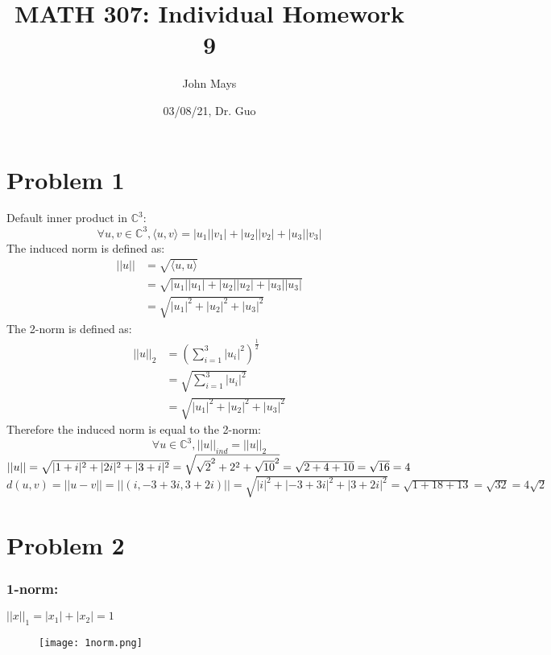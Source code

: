\documentclass{article}
\title{\textbf{MATH 307: Individual Homework 9}}
\author{John Mays}
\date{03/08/21, Dr. Guo}
\begin{document}
\maketitle

\section*{Problem 1}
Default inner product in $\mathbb{C}^3$:
\begin{equation*}
    \forall u,v \in \mathbb{C}^3, \langle u,v \rangle = |u_1||v_1|+|u_2||v_2|+|u_3||v_3|
\end{equation*}
The induced norm is defined as:
\begin{equation*}
    \begin{split}
        ||u||&=\sqrt{\langle u, u \rangle}\\
        &=\sqrt{|u_1||u_1|+|u_2||u_2|+|u_3||u_3|}\\
        &={\sqrt{|u_1|^2+|u_2|^2+|u_3|^2}}
    \end{split}
\end{equation*}
The 2-norm is defined as:
\begin{equation*}
    \begin{split}
        ||u||_2&= \left( \sum_{i=1}^{3}|u_i|^{2}\right)^{\frac{1}{2}}\\
        &=\sqrt{\sum_{i=1}^{3}|u_i|^{2}}\\
        &={\sqrt{|u_1|^2+|u_2|^2+|u_3|^2}}
    \end{split}
\end{equation*}
Therefore the induced norm is equal to the 2-norm:
\begin{equation*}
    \forall u \in \mathbb{C}^3, ||u||_{ind}=||u||_{2}
\end{equation*}
$||u||=\sqrt{|1+i|^2+|2i|^2+|3+i|^2}=\sqrt{\sqrt{2}^2+2^2+\sqrt{10}^2}\\
=\sqrt{2+4+10}=\sqrt{16}=4$\\
$d(u,v)=||u-v||=||(i,-3+3i,3+2i)||=\sqrt{|i|^2+|-3+3i|^2+|3+2i|^2}=\sqrt{1+18+13}=\sqrt{32}=4\sqrt{2}$
\pagebreak
\section*{Problem 2}
\subsubsection*{1-norm:}
$||x||_1=|x_1|+|x_2|=1$
\begin{figure}[htp]
    \texttt{[image: 1norm.png]}
\end{figure}
\end{document}
